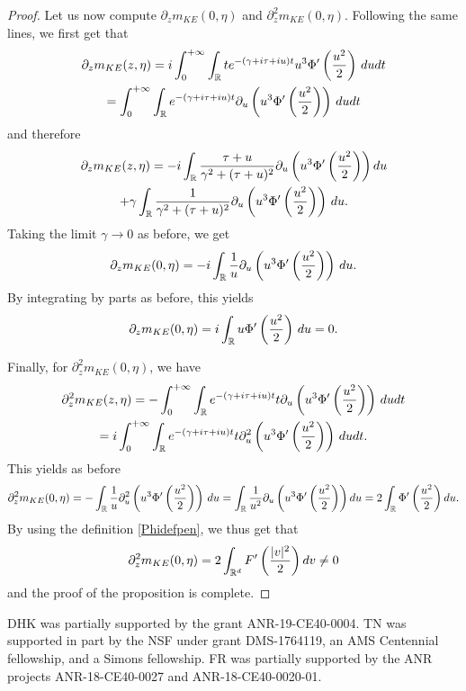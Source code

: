 \documentclass[11pt]{amsart}
\numberwithin{equation}{section}
\begin{document}
\begin{proof}
      Let us now  compute $\partial_{z}m_{KE}(0, \eta)$ and $\partial_{z}^2 m_{KE}(0, \eta)$.
      Following the same lines, we  first get that
    \begin{multline*}
    \partial_{z}m_{KE}(z, \eta) =  i \int_{0}^{+ \infty} \int_{\mathbb{R}}  t  e^{ -( \gamma + i \tau  + i  u) t} 
   u^3 \Phi'\left( {  u^2 \over 2} \right)\, du dt  \\=  \int_{0}^{ + \infty} \int_{\mathbb{R}}e^{ -( \gamma + i \tau  + i  u) t}  \partial_{u}\left(  u^3 \Phi'\left( {  u^2 \over 2} \right)
    \right)\, du dt
        \end{multline*}
    and therefore
 \begin{multline*}
   \partial_{z}m_{KE}(z, \eta)= - i   \int_{\mathbb{R}} { \tau + u \over \gamma^2 + (\tau + u)^2}  \partial_{u}\left(  u^3 \Phi'\left( {  u^2 \over 2} \right)
    \right)
   du  \\+  \gamma \int_{\mathbb{R}}  { 1 \over \gamma^2 + (\tau + u)^2}  \partial_{u}\left(  u^3 \Phi'\left( {  u^2 \over 2} \right)
    \right)
   \, du.  
    \end{multline*}
    Taking the limit $\gamma\rightarrow 0$ as before, we get 
  $$
   \partial_{z}m_{KE}(0, \eta)  = 
     - i  \int_{\mathbb{R}}  { 1  \over u }  \partial_{u}\left(  u^3 \Phi'\left( {  u^2 \over 2} \right)
    \right) \, du.    
   $$
   By integrating by parts as before, this yields
 $$   \partial_{z}m_{KE}(0, \eta)  =   i \int_{\mathbb{R}} u \Phi'\left( {  u^2 \over 2} \right)\, du = 0
    .$$
 
  Finally,  for  $\partial_{z}^2m_{KE}(0, \eta)$, we have
 \begin{multline*} \partial_{z}^2m_{KE}(z, \eta) = -  \int_{0}^{ + \infty} \int_{\mathbb{R}}e^{ -( \gamma + i \tau  + i  u) t}  t  \partial_{u}\left(  u^3 \Phi' \left( {  u^2 \over 2} \right)
    \right)\, du dt \\ = i   \int_{0}^{ + \infty} \int_{\mathbb{R}}e^{ -( \gamma + i \tau  + i  u) t}  t  \partial_{u}^2\left(  u^3 \Phi'\left( {  u^2 \over 2} \right)   \right)\, du dt.
    \end{multline*} 
  This yields as before
  $$  \partial_{z}^2m_{KE}(0, \eta) = -  \int_{\mathbb{R}} { 1 \over u} \partial_{u}^2\left( u^3 \Phi' \left( {  u^2 \over 2} \right)    \right)\, du= \int_{\mathbb{R}}  { 1 \over u^2} \partial_{u}\left( u^3 \Phi' \left( {  u^2 \over 2} \right) \right) du
     =  2 \int_{\mathbb{R}} \Phi' \left( {  u^2 \over 2} \right) du.$$
     By using the definition \eqref{Phidefpen}, we thus get that
  $$  \partial_{z}^2m_{KE}(0, \eta) =  2 \int_{\mathbb{R}^d} F'\left( {  |v|^2 \over 2} \right) dv \neq 0$$
 and the proof of the proposition is complete.
 \end{proof}

\bigskip

DHK was partially supported by the grant ANR-19-CE40-0004. TN was supported in part by the NSF under grant DMS-1764119, an AMS Centennial fellowship, and a Simons fellowship. FR was partially supported by the ANR  projects  ANR-18-CE40-0027
 and ANR-18-CE40-0020-01.




\end{document}

